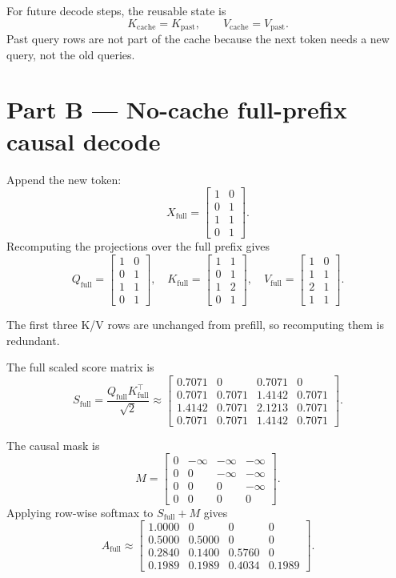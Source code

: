 \documentclass[11pt]{article}
\begin{document}
For future decode steps, the reusable state is
\[
K_{\mathrm{cache}}=K_{\mathrm{past}},\qquad
V_{\mathrm{cache}}=V_{\mathrm{past}}.
\]
Past query rows are not part of the cache because the next token needs a new query, not the old queries.

\section*{Part B --- No-cache full-prefix causal decode}

Append the new token:
\[
X_{\mathrm{full}}=
\begin{bmatrix}
1&0\\0&1\\1&1\\0&1
\end{bmatrix}.
\]
Recomputing the projections over the full prefix gives
\[
Q_{\mathrm{full}}=
\begin{bmatrix}
1&0\\0&1\\1&1\\0&1
\end{bmatrix},
\quad
K_{\mathrm{full}}=
\begin{bmatrix}
1&1\\0&1\\1&2\\0&1
\end{bmatrix},
\quad
V_{\mathrm{full}}=
\begin{bmatrix}
1&0\\1&1\\2&1\\1&1
\end{bmatrix}.
\]

The first three K/V rows are unchanged from prefill, so recomputing them is redundant.

The full scaled score matrix is
\[
S_{\mathrm{full}}
=\frac{Q_{\mathrm{full}}K_{\mathrm{full}}^\top}{\sqrt{2}}
\approx
\begin{bmatrix}
0.7071&0&0.7071&0\\
0.7071&0.7071&1.4142&0.7071\\
1.4142&0.7071&2.1213&0.7071\\
0.7071&0.7071&1.4142&0.7071
\end{bmatrix}.
\]

The causal mask is
\[
M=
\begin{bmatrix}
0&-\infty&-\infty&-\infty\\
0&0&-\infty&-\infty\\
0&0&0&-\infty\\
0&0&0&0
\end{bmatrix}.
\]
Applying row-wise softmax to $S_{\mathrm{full}}+M$ gives
\[
A_{\mathrm{full}}
\approx
\begin{bmatrix}
1.0000&0&0&0\\
0.5000&0.5000&0&0\\
0.2840&0.1400&0.5760&0\\
0.1989&0.1989&0.4034&0.1989
\end{bmatrix}.
\]
\end{document}
